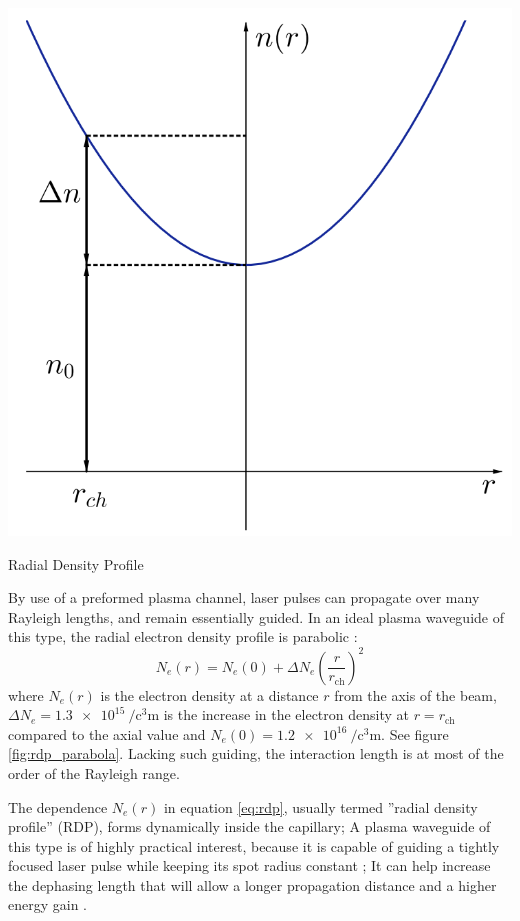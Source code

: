 \documentclass[justified,nofonts,nobib,openany]{tufte-book}
\begin{document}
\begin{marginfigure}
    \includegraphics[width=\marginparwidth]{figures/rdp.PNG}
    \caption{Radial Density Profile}
    \label{fig:rdp_parabola}
\end{marginfigure}
By use of a preformed plasma channel, laser pulses can propagate over many Rayleigh lengths, and remain essentially guided. In an ideal plasma waveguide of this type, the radial electron density profile is parabolic \cite{Sprangle1992PropagationPlasmas}:
\begin{equation}
    N_e(r)=N_e(0)+\Delta N_e\left( \frac{r}{r_\text{ch}}\right)^2
    \label{eq:rdp}
\end{equation}
where $N_e(r)$ is the electron density at a distance $r$ from the axis of the beam, $\Delta N_e=\SI{1.3e15}{\per\cubic\centi\metre}$ is the increase in the electron density at $r=r_\text{ch}$ compared to the axial value and $N_e(0)=\SI{1.2e16}{\per\cubic\centi\metre}$. See figure \ref{fig:rdp_parabola}. Lacking such guiding, the interaction length is at most of the order of the Rayleigh range.

The dependence $N_e\left(r\right)$ in equation \ref{eq:rdp}, usually termed ”radial density profile” (RDP), forms dynamically inside the capillary; A plasma waveguide of this type is of highly practical interest, because it is capable of guiding a tightly focused laser pulse while keeping its spot radius constant \cite{Sprangle1992PropagationPlasmas,Esarey1997Self-focusingPlasmas}; It can help increase the dephasing length that will allow a longer propagation distance and a higher energy gain \cite{Sprangle2000StableAcceleration}.
\end{document}
